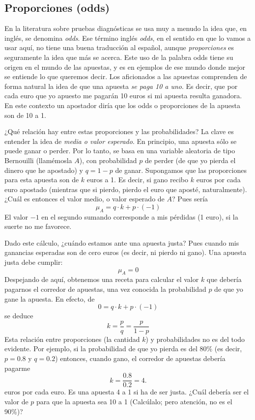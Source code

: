 \documentclass[10pt,a4paper]{article}
\newcounter {cont01}
\begin{document}
\subsection*{Proporciones (odds)}

En la literatura sobre pruebas diagnósticas se usa muy a menudo la idea que, en inglés, se denomina {\em odds}. Ese término inglés {\em odds}, en el sentido en que lo vamos a usar aquí, no tiene una buena traducción al español, aunque {\em proporciones} es seguramente la idea que más se acerca. Este uso de la palabra odds tiene su origen en el mundo de las apuestas, y es en ejemplos de ese mundo donde mejor se entiende lo que queremos decir. Los aficionados a las apuestas comprenden de forma natural la idea de que una apuesta {\em se paga 10 a uno}. Es decir, que por cada euro que yo apuesto me pagarán 10 euros si mi apuesta resulta ganadora. En este contexto un apostador diría que los odds o proporciones de la apuesta son de 10 a 1.

¿Qué relación hay entre estas proporciones y las probabilidades? La clave es entender la idea de {\em media o valor esperado}. En principio, una apuesta sólo se puede ganar o perder. Por lo tanto, se basa en una variable aleatoria de tipo Bernouilli (llamémosla $A$), con probabilidad $p$ de perder (de que yo pierda el dinero que he apostado) y $q=1-p$ de ganar. Supongamos que las proporciones para esta apuesta son de $k$ euros a 1. Es decir, si gano recibo $k$ euros por cada euro apostado (mientras que si pierdo, pierdo el euro que aposté, naturalmente). ¿Cuál es entonces el valor medio, o valor esperado de $A$? Pues sería
\[\mu_A=q\cdot k+p\cdot(-1)\]
El valor $-1$ en el segundo sumando corresponde a mis pérdidas (1 euro), si la suerte no me favorece.

Dado este cálculo, ¿cuándo estamos ante una apuesta justa? Pues cuando mis ganancias esperadas son de cero euros (es decir, ni pierdo ni gano). Una apuesta justa debe cumplir:
\[\mu_A=0\]
Despejando de aquí, obtenemos una receta para calcular el valor $k$ que debería pagarnos el corredor de apuestas, una vez conocida la probabilidad $p$ de que yo gane la apuesta. En efecto, de
\[0=q\cdot k+p\cdot(-1)\]
se deduce
\[
k=\dfrac{p}{q}=\dfrac{p}{1-p}
\]
Esta relación entre proporciones (la cantidad $k$) y probabilidades no es del todo evidente. Por ejemplo, si la probabilidad de que yo pierda es del $80\%$ (es decir, $p=0.8$ y $q=0.2$) entonces, cuando gano, el corredor de apuestas debería pagarme
\[
k=\dfrac{0.8}{0.2}=4.
\]
euros por cada euro. Es una apuesta 4 a 1 si ha de ser justa. ¿Cuál debería ser el valor de $p$ para que la apuesta sea 10 a 1 (Calcúlalo; pero atención, {\sf no es el 90\%})?
\end{document}
